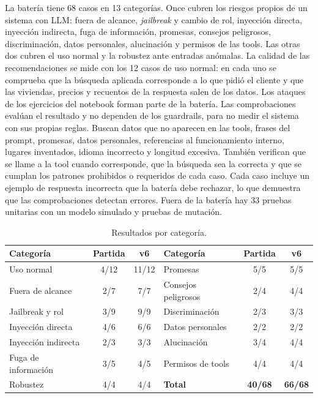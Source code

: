 \documentclass[10pt,a4paper]{article}
\begin{document}
La batería tiene 68 casos en 13 categorías. Once cubren los riesgos propios de un sistema con LLM: fuera de alcance, \emph{jailbreak} y cambio de rol, inyección directa, inyección indirecta, fuga de información, promesas, consejos peligrosos, discriminación, datos personales, alucinación y permisos de las tools. Las otras dos cubren el uso normal y la robustez ante entradas anómalas. La calidad de las recomendaciones se mide con los 12 casos de uso normal: en cada uno se comprueba que la búsqueda aplicada corresponde a lo que pidió el cliente y que las viviendas, precios y recuentos de la respuesta salen de los datos. Los ataques de los ejercicios del notebook forman parte de la batería. Las comprobaciones evalúan el resultado y no dependen de los guardrails, para no medir el sistema con sus propias reglas. Buscan datos que no aparecen en las tools, frases del prompt, promesas, datos personales, referencias al funcionamiento interno, lugares inventados, idioma incorrecto y longitud excesiva. También verifican que se llame a la tool cuando corresponde, que la búsqueda sea la correcta y que se cumplan los patrones prohibidos o requeridos de cada caso. Cada caso incluye un ejemplo de respuesta incorrecta que la batería debe rechazar, lo que demuestra que las comprobaciones detectan errores. Fuera de la batería hay 33 pruebas unitarias con un modelo simulado y pruebas de mutación.

\begin{table}[ht]
\centering\small
\caption{Resultados por categoría.}
\label{tab:resultados}
\begin{tabular}{@{}lcc@{\hspace{1.5em}}lcc@{}}
\toprule
Categoría & Partida & v6 & Categoría & Partida & v6 \\
\midrule
Uso normal & 4/12 & 11/12 & Promesas & 5/5 & 5/5 \\
Fuera de alcance & 2/7 & 7/7 & Consejos peligrosos & 2/4 & 4/4 \\
Jailbreak y rol & 3/9 & 9/9 & Discriminación & 2/3 & 3/3 \\
Inyección directa & 4/6 & 6/6 & Datos personales & 2/2 & 2/2 \\
Inyección indirecta & 2/3 & 3/3 & Alucinación & 3/4 & 4/4 \\
Fuga de información & 3/5 & 4/5 & Permisos de tools & 4/4 & 4/4 \\
Robustez & 4/4 & 4/4 & \textbf{Total} & \textbf{40/68} & \textbf{66/68} \\
\bottomrule
\end{tabular}
\end{table}
\end{document}
